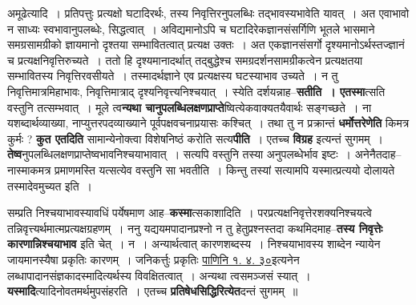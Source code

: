 \documentclass[article,12pt,a4paper]{memoir}
\begin{document}
	अमूढेत्यादि । प्रतिपत्तुः प्रत्यक्षो घटादिरर्थः, तस्य निवृत्तिरनुपलब्धिः तद्भावस्यभावेति यावत् । अत एवाभावो न साध्यः स्वभावानुपलब्धेः, सिद्धत्वात् । अविद्यमानोऽपि च घटादिरेकज्ञानसंसर्गिणि भूतले भासमाने समग्रसामग्रीको ज्ञायमानो दृश्तया सम्भावितत्वात् प्रत्यक्ष उक्तः । अत एकज्ञानसंसर्गो दृश्यमानोऽर्थस्तज्ज्ञानं च प्रत्यक्षनिवृत्तिरुच्यते । ततो हि दृश्यमानादर्थात् तद्बुद्धेश्च समग्रदर्शनसामग्रीकत्वेन प्रत्यक्षतया सम्भावितस्य निवृत्तिरवसीयते । तस्मादर्थज्ञाने एव प्रत्यक्षस्य घटस्याभाव उच्यते । न तु निवृत्तिमात्रमिहाभावः, निवृत्तिमात्राद् दृश्यनिवृत्त्यनिश्चयात् । स्येति दर्शयन्नाह--\textbf{सतीति । एतस्मा}त्सति वस्तुनि तत्सम्भवात् । मूले त्व\textbf{न्यथा चानुपलब्धिलक्षणप्राप्ते}ष्वित्येकवाक्यतयैवार्थः सङ्गच्छते । ना यशब्दार्थव्याख्या, नाप्युत्तरपदव्याख्याने पूर्वपक्षवचनाप्रयासः कश्चित् । तथा तु न प्रक्रान्तं \textbf{धर्मोत्तरेणेति} किमत्र कुर्मः ? \textbf{कुत एतदिति} सामान्येनोक्त्वा विशेषनिष्ठं करोति सत्य\textbf{पीति} । एतच्च \textbf{विग्रह} इत्यन्तं सुगमम् । \textbf{तेष्व}नुपलब्धिलक्षणप्राप्तेष्वभावनिश्चयाभावात् । सत्यपि वस्तुनि तस्या अनुपलब्धेर्भाव इष्टः । अनेनैतदाह--नास्माकमत्र प्रमाणमस्ति यत्सत्येव वस्तुनि सा भवतीति । किन्तु तस्यां सत्यामपि यस्मात्प्रत्ययो दोलायते तस्मादेवमुच्यत इति ।
	\pend
      

	  \pstart सम्प्रति निश्चयाभावस्यावधिं पर्येषमाण आह--\textbf{कस्मा}त्सकाशादिति । परप्रत्यक्षनिवृत्तेरशक्यनिश्चयत्वे तन्निवृत्त्यर्थमात्मप्रत्यक्षग्रहणम् । ननु यद्ययमपादानप्रश्नो न तु हेतुप्रश्नस्तदा कथमिदमाह--\textbf{तस्य निवृत्तेः कारणान्निश्चयाभाव} इति चेत् । न । अन्यार्थत्वात् कारणशब्दस्य । निश्चयाभावस्य शाब्देन न्यायेन जायमानस्यैषा प्रकृतिः कारणम् । जनिकर्त्तुः प्रकृतिः \href{http://sarit.indology.info/?cref=Pā.1.4.30}{पाणिनि १. ४. ३०}इत्यनेन लब्धापादानसंज्ञकादस्मादित्यर्थस्य विवक्षितत्वात् । अन्यथा त्वसमञ्जसं स्यात् । \textbf{यस्मादि}त्यादिनोवतमर्थमुपसंहरति । एतच्च \textbf{प्रतिषेधसिद्धिरित्येत}दन्तं सुगमम् ॥
	\pend
      
\end{document}
